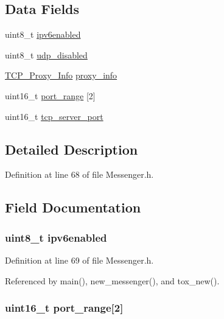 \subsection*{Data Fields}
\begin{DoxyCompactItemize}
\item 
uint8\+\_\+t \hyperlink{struct_messenger___options_abf85a84f394474115b9f45f037ad3378}{ipv6enabled}
\item 
uint8\+\_\+t \hyperlink{struct_messenger___options_a1510f9751065ec1a6d485c4b3072b9d7}{udp\+\_\+disabled}
\item 
\hyperlink{struct_t_c_p___proxy___info}{T\+C\+P\+\_\+\+Proxy\+\_\+\+Info} \hyperlink{struct_messenger___options_aa737023350cf47e63993e3b4dc9a7472}{proxy\+\_\+info}
\item 
uint16\+\_\+t \hyperlink{struct_messenger___options_a6a840950904ae4d13e6726cf5f341fc0}{port\+\_\+range} \mbox{[}2\mbox{]}
\item 
uint16\+\_\+t \hyperlink{struct_messenger___options_a9f404f426cc09060b42b9a61523cc573}{tcp\+\_\+server\+\_\+port}
\end{DoxyCompactItemize}


\subsection{Detailed Description}


Definition at line 68 of file Messenger.\+h.



\subsection{Field Documentation}
\hypertarget{struct_messenger___options_abf85a84f394474115b9f45f037ad3378}{
\subsubsection[{ipv6enabled}]{\setlength{\rightskip}{0pt plus 5cm}uint8\+\_\+t ipv6enabled}}\label{struct_messenger___options_abf85a84f394474115b9f45f037ad3378}


Definition at line 69 of file Messenger.\+h.



Referenced by main(), new\+\_\+messenger(), and tox\+\_\+new().

\hypertarget{struct_messenger___options_a6a840950904ae4d13e6726cf5f341fc0}{
\subsubsection[{port\+\_\+range}]{\setlength{\rightskip}{0pt plus 5cm}uint16\+\_\+t port\+\_\+range\mbox{[}2\mbox{]}}}\label{struct_messenger___options_a6a840950904ae4d13e6726cf5f341fc0}



